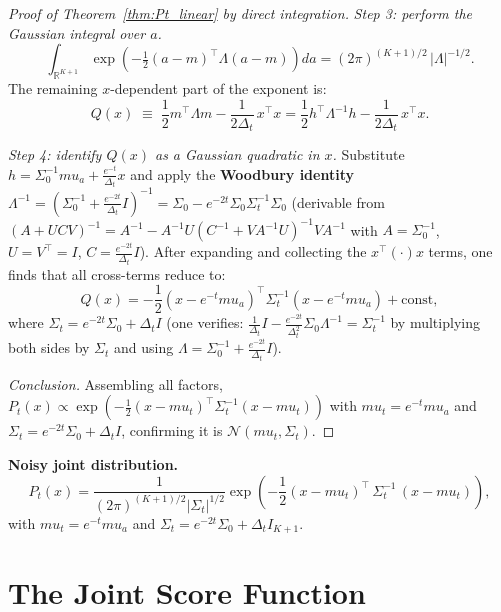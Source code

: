 \documentclass[12pt, a4paper]{article}
\def\ba{a}%
\def\bx{x}%
\def\bmu{mu}%
\def\bm#1{#1}%
\theoremstyle{definition}
\newcommand{\R}{\mathbb{R}}
\newcommand{\N}{\mathcal{N}}
\newcommand{\ba}{\bm{a}}
\newcommand{\bx}{\bm{x}}
\newcommand{\bmu}{\bm{\mu}}
\newcommand{\dt}{\Delta_t}
\begin{document}
\begin{proof}[Proof of Theorem~\ref{thm:Pt_linear} by direct integration]
\medskip
\noindent\textit{Step 3: perform the Gaussian integral over $\ba$.}
\[
  \int_{\R^{K+1}}
    \exp\!\left(-\tfrac{1}{2}(\ba-\bm{m})^\top\Lambda(\ba-\bm{m})\right)d\ba
  = (2\pi)^{(K+1)/2}\,|\Lambda|^{-1/2}.
\]
The remaining $\bx$-dependent part of the exponent is:
\[
  Q(\bx)
  \;\equiv\;
  \frac{1}{2}\bm{m}^\top\Lambda\bm{m} - \frac{1}{2\dt}\,\bx^\top\bx
  = \frac{1}{2}\bm{h}^\top\Lambda^{-1}\bm{h} - \frac{1}{2\dt}\,\bx^\top\bx.
\]

\medskip
\noindent\textit{Step 4: identify $Q(\bx)$ as a Gaussian quadratic in $\bx$.}
Substitute $\bm{h} = \Sigma_0^{-1}\bmu_a + \frac{e^{-t}}{\dt}\bx$ and
apply the \textbf{Woodbury identity}
$\Lambda^{-1} = \left(\Sigma_0^{-1}+\frac{e^{-2t}}{\dt}I\right)^{-1}
= \Sigma_0 - e^{-2t}\Sigma_0\Sigma_t^{-1}\Sigma_0$
(derivable from $(A+UCV)^{-1} = A^{-1}-A^{-1}U(C^{-1}+VA^{-1}U)^{-1}VA^{-1}$
with $A=\Sigma_0^{-1}$, $U=V^\top=I$, $C=\frac{e^{-2t}}{\dt}I$).
After expanding and collecting the $\bx^\top(\cdot)\bx$ terms, one finds
that all cross-terms reduce to:
\[
  Q(\bx)
  = -\frac{1}{2}(\bx - e^{-t}\bmu_a)^\top \Sigma_t^{-1}(\bx - e^{-t}\bmu_a)
    + \text{const},
\]
where $\Sigma_t = e^{-2t}\Sigma_0 + \dt I$ (one verifies:
$\frac{1}{\dt}I - \frac{e^{-2t}}{\dt^2}\Sigma_0\Lambda^{-1} = \Sigma_t^{-1}$
by multiplying both sides by $\Sigma_t$ and using $\Lambda = \Sigma_0^{-1}+\frac{e^{-2t}}{\dt}I$).

\medskip
\noindent\textit{Conclusion.}
Assembling all factors, $P_t(\bx) \propto
\exp\!\left(-\frac{1}{2}(\bx-\bmu_t)^\top\Sigma_t^{-1}(\bx-\bmu_t)\right)$
with $\bmu_t = e^{-t}\bmu_a$ and $\Sigma_t = e^{-2t}\Sigma_0+\dt I$,
confirming it is $\N(\bmu_t,\Sigma_t)$.
\end{proof}

\begin{resultbox}
\textbf{Noisy joint distribution.}
\[
  \boxed{
  P_t(\bx)
  = \frac{1}{(2\pi)^{(K+1)/2}|\Sigma_t|^{1/2}}
    \exp\!\left(
      -\frac{1}{2}(\bx - \bmu_t)^\top\,\Sigma_t^{-1}\,(\bx - \bmu_t)
    \right),}
\]
with $\bmu_t = e^{-t}\bmu_a$ and
$\Sigma_t = e^{-2t}\Sigma_0 + \dt I_{K+1}$.
\end{resultbox}

\section{The Joint Score Function}
\end{document}
